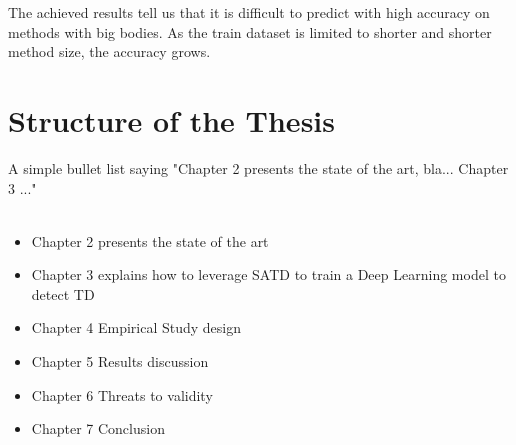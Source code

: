 The achieved results tell us that it is difficult to predict with high accuracy on methods with big bodies. As the train dataset is limited to shorter and shorter method size, the accuracy grows. 


\section{Structure of the Thesis}
A simple bullet list saying "Chapter 2 presents the state of the art, bla... Chapter 3 ..."
\\
\\

\begin{itemize}
  \item Chapter 2 presents the state of the art
  \item Chapter 3 explains how to leverage SATD to train a Deep Learning model to detect TD
  \item Chapter 4 Empirical Study design
  \item Chapter 5 Results discussion
  \item Chapter 6 Threats to validity
  \item Chapter 7 Conclusion
\end{itemize}

